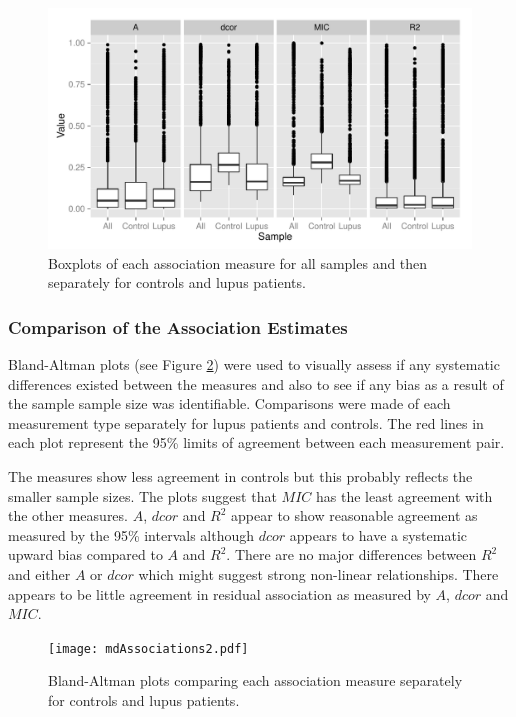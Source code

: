 \documentclass[a4paper, 12pt]{report}
\begin{document}
\begin{figure}[H]
\begin{center}
\includegraphics[width=\textwidth]{associationBox.pdf}
\caption{Boxplots of each association measure for all samples and then separately for controls and lupus patients.} 
\label{F:associationBox}
\end{center}
\end{figure}

\subsubsection{Comparison of the Association Estimates}
Bland-Altman \cite{Altman1983} plots (see Figure \ref{F:baTwoway}) were used to visually assess if any systematic differences existed between the measures and also to see if any bias as a result of the sample sample size was identifiable. Comparisons were made of each measurement type separately for lupus patients and controls. The red lines in each plot represent the 95\% limits of agreement between each measurement pair. 

The measures show less agreement in controls but this probably reflects the smaller sample sizes. The plots suggest that $MIC$ has the least agreement with the other measures. $A$, $dcor$ and $R^2$ appear to show reasonable agreement  as measured by the 95\% intervals although $dcor$ appears to have a systematic upward bias compared to $A$ and $R^2$. There are  no major differences between $R^2$ and either $A$ or $dcor$ which might suggest strong non-linear relationships. There appears to be little agreement in residual association as measured by $A$, $dcor$ and $MIC$.

\begin{figure}[H]
\begin{center}
\texttt{[image: mdAssociations2.pdf]}
\caption{Bland-Altman plots comparing each association measure separately for controls and lupus patients.} 
\label{F:baTwoway}
\end{center}
\end{figure}
\end{document}
